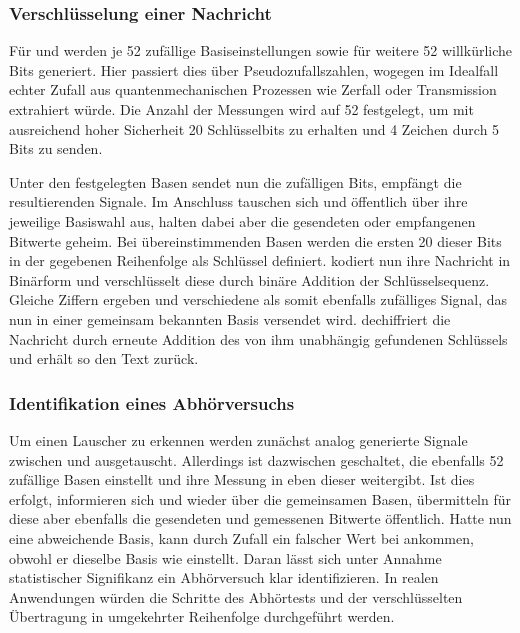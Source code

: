 \subsubsection{Verschlüsselung einer Nachricht}

Für \grqq{} und \grqq{} werden je 52 zufällige Basiseinstellungen sowie für \grqq{} weitere 52
willkürliche Bits generiert. Hier passiert dies über Pseudozufallszahlen, wogegen im Idealfall echter Zufall aus quantenmechanischen
Prozessen wie Zerfall oder Transmission extrahiert würde. Die Anzahl der Messungen wird auf 52 festgelegt, um mit ausreichend hoher
Sicherheit 20 Schlüsselbits zu erhalten und 4 Zeichen durch 5 Bits zu senden.

Unter den festgelegten Basen sendet \grqq{} nun die zufälligen Bits, \grqq{} empfängt die resultierenden Signale.
Im Anschluss tauschen sich \grqq{} und \grqq{} öffentlich über ihre jeweilige Basiswahl aus, halten dabei aber die
gesendeten oder empfangenen Bitwerte geheim. Bei übereinstimmenden Basen werden die ersten 20 dieser Bits in der gegebenen Reihenfolge
als Schlüssel definiert. \grqq{} kodiert nun ihre Nachricht in Binärform und verschlüsselt diese durch binäre Addition der
Schlüsselsequenz. Gleiche Ziffern ergeben \grqq{} und verschiedene \grqq{} als somit ebenfalls zufälliges Signal, das
nun in einer gemeinsam bekannten Basis versendet wird. \grqq{} dechiffriert die Nachricht durch erneute Addition des von ihm
unabhängig gefundenen Schlüssels und erhält so den Text zurück.


\subsubsection{Identifikation eines Abhörversuchs}

Um einen Lauscher zu erkennen werden zunächst analog generierte Signale zwischen \grqq{} und \grqq{} ausgetauscht.
Allerdings ist dazwischen \grqq{} geschaltet, die ebenfalls 52 zufällige Basen einstellt und ihre Messung in eben dieser
weitergibt. Ist dies erfolgt, informieren sich \grqq{} und \grqq{} wieder über die gemeinsamen Basen, übermitteln
für diese aber ebenfalls die gesendeten und gemessenen Bitwerte öffentlich. Hatte nun \grqq{} eine abweichende Basis, kann durch
Zufall ein falscher Wert bei \grqq{} ankommen, obwohl er dieselbe Basis wie \grqq{} einstellt. Daran lässt sich
unter Annahme statistischer Signifikanz ein Abhörversuch klar identifizieren. In realen Anwendungen würden die Schritte des Abhörtests
und der verschlüsselten Übertragung in umgekehrter Reihenfolge durchgeführt werden.
